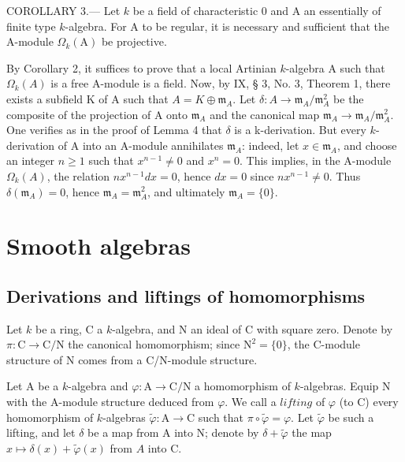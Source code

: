 COROLLARY 3.--- Let \(k\) be a field of characteristic 0 and A an essentially of finite type \(k\)-algebra. For A to be regular, it is necessary and sufficient that the A-module \(\Omega_{k}(\mathrm{A})\) be projective.

By Corollary 2, it suffices to prove that a local Artinian \(k\)-algebra A such that \(\Omega_k(A)\) is a free A-module is a field. Now, by IX, § 3, No. 3, Theorem 1, there exists a subfield K of A such that \(A = K \oplus \mathfrak{m}_A\). Let \(\delta: A \to \mathfrak{m}_A / \mathfrak{m}_A^2\) be the composite of the projection of A onto \(\mathfrak{m}_A\) and the canonical map \(\mathfrak{m}_A \to \mathfrak{m}_A / \mathfrak{m}_A^2\). One verifies as in the proof of Lemma 4 that \(\delta\) is a k-derivation. But every \(k\)-derivation of A into an A-module annihilates \(\mathfrak{m}_A\): indeed, let \(x \in \mathfrak{m}_A\), and choose an integer \(n \geqslant 1\) such that \(x^{n-1} \neq 0\) and \(x^n = 0\). This implies, in the A-module \(\Omega_k(A)\), the relation \(nx^{n-1} dx = 0\), hence \(dx = 0\) since \(nx^{n-1} \neq 0\). Thus \(\delta(\mathfrak{m}_A) = 0\), hence \(\mathfrak{m}_A = \mathfrak{m}_A^2\), and ultimately \(\mathfrak{m}_A = \{0\}\).

\section{Smooth algebras}

\subsection{Derivations and liftings of homomorphisms}

Let \(k\) be a ring, C a \(k\)-algebra, and N an ideal of C with square zero. Denote by \(\pi : \mathrm{C} \to \mathrm{C/N}\) the canonical homomorphism; since \(\mathrm{N}^2 = \{0\}\), the C-module structure of N comes from a C/N-module structure.

Let A be a \(k\)-algebra and \(\varphi : \mathrm{A} \to \mathrm{C/N}\) a homomorphism of \(k\)-algebras. Equip N with the A-module structure deduced from \(\varphi\). We call a \(lifting\) of \(\varphi\) (to C) every homomorphism of \(k\)-algebras \(\tilde{\varphi} : \mathrm{A} \to \mathrm{C}\) such that \(\pi \circ \tilde{\varphi} = \varphi\). Let \(\tilde{\varphi}\) be such a lifting, and let \(\delta\) be a map from A into N; denote by \(\delta + \tilde{\varphi}\) the map \(x \mapsto \delta(x) + \tilde{\varphi}(x)\) from \(A\) into C.

